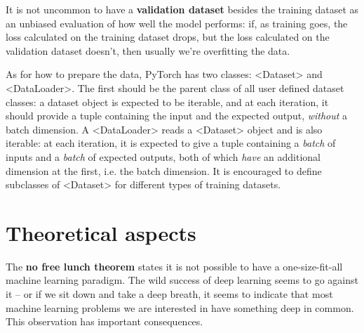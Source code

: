 \documentclass[hyperref, a4paper, 12pt]{report}
\newcommand*{\concept}[1]{{\textbf{#1}}}
\def\texttt#1{<#1>}%
\newcommand{\shortcode}[1]{\texttt{#1}}
\begin{document}
It is not uncommon to have a \concept{validation dataset} besides the training dataset
as an unbiased evaluation of how well the model performs:
if, as training goes, the loss calculated on the training dataset drops,
but the loss calculated on the validation dataset doesn't,
then usually we're overfitting the data.

As for how to prepare the data,
PyTorch has two classes: \shortcode{Dataset} and \shortcode{DataLoader}.
The first should be the parent class of all user defined dataset classes:
a dataset object is expected to be iterable,
and at each iteration, it should provide a tuple
containing the input and the expected output,
\emph{without} a batch dimension.
A \shortcode{DataLoader} reads a \shortcode{Dataset} object and is also iterable:
at each iteration, it is expected to give a tuple 
containing a \emph{batch} of inputs and a \emph{batch} of expected outputs,
both of which \emph{have} an additional dimension at the first, i.e. the batch dimension.
It is encouraged to define subclasses of \shortcode{Dataset}
for different types of training datasets.

\section{Theoretical aspects}\label{sec:theoretical-aspects}

The \concept{no free lunch theorem} states it is not possible to have a one-size-fit-all machine learning paradigm.
The wild success of deep learning seems to go against it -- or if we sit down and take a deep breath, it seems to indicate that most machine learning problems we are interested in have something deep in common.
This observation has important consequences.
\end{document}
